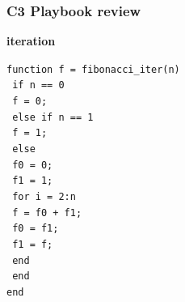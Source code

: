 \documentclass[
	11pt, %
]{beamer}
\begin{document}
\begin{frame}
	\frametitle{C3 Playbook review}

    \textbf{iteration}

\texttt{function f = fibonacci\_iter(n)} \\
\texttt{  \quad  if n == 0} \\
\texttt{    \quad  \quad     f = 0;} \\
\texttt{    \quad else if n == 1} \\
\texttt{    \quad  \quad     f = 1;} \\
\texttt{    \quad else} \\
\texttt{     \quad  \quad    f0 = 0;} \\
\texttt{ \quad  \quad f1 = 1;} \\
\texttt{    \quad  \quad     for i = 2:n} \\
\texttt{      \quad  \quad  \quad       f = f0 + f1;} \\
\texttt{      \quad  \quad  \quad       f0 = f1;} \\
\texttt{  \quad  \quad  \quad       f1 = f;} \\
\texttt{      \quad  \quad   end} \\
\texttt{   \quad  end} \\
\texttt{end} \\
\end{frame}

\end{document}
